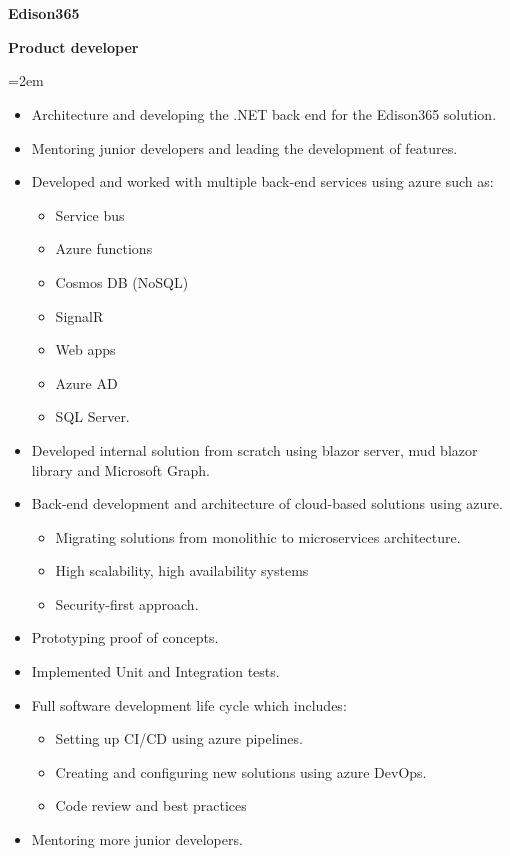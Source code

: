 \documentclass[paper=a4,fontsize=12pt]{article} %
\newcommand{\sepspace}{\vspace*{1em}}
\newcommand{\NewPart}[1]{\section*{\text{#1}}}
\newcommand{\EducationEntry}[4]{
		\noindent \textbf{#1} \hfill      %
		\colorbox{White}{%
			\parbox{6em}{%
			\hfill\color{Black}#2}} \par  %
		\noindent \textbf{#3} \par        %
		\noindent\hangindent=2em\hangafter=0 \small #4 %
		\normalsize \par}
\begin{document}
\sepspace

	

\NewPart{Employment}{}

\EducationEntry{Edison365}{\textbf{\hspace{-2cm}{May2021-Present}}}{Product developer}{\begin{itemize}
		\itemsep-0.1em 
		\item Architecture and developing the .NET back end for the Edison365 solution.
		\item Mentoring junior developers and leading the development of features.
		\item Developed and worked with multiple back-end services using azure such as:
			\begin{itemize}
                 \item  Service bus
                  \item Azure functions
                  \item Cosmos DB (NoSQL)
                   \item SignalR
				\item Web apps 
                    \item Azure AD
                    \item SQL Server.
	  	\end{itemize}
           \item  Developed internal solution from scratch using blazor server, mud blazor library and Microsoft Graph.
    \item Back-end development and architecture of cloud-based solutions using azure.
			\begin{itemize}
                 \item Migrating solutions from monolithic to microservices architecture.
                 \item  High scalability, high availability systems
                 \item Security-first approach.
			\end{itemize}
\item Prototyping proof of concepts.
\item Implemented Unit and Integration tests.
\item  Full software development life cycle which includes:
 		\begin{itemize}
               \item Setting up CI/CD using azure pipelines.
                \item Creating and configuring new solutions using azure DevOps.  
                  \item Code review and best practices              
           \end{itemize}
\item Mentoring more junior developers.

\end{itemize} }
\end{document}
